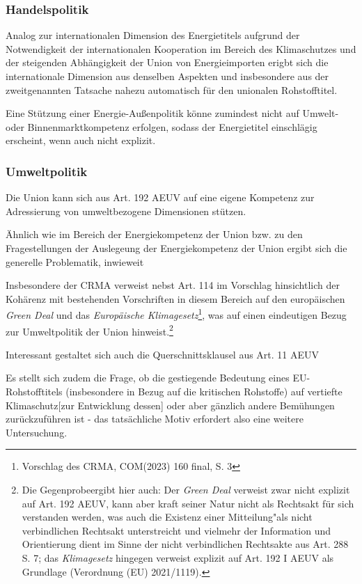 \documentclass[12pt,a4paper,oneside]{book} %
\begin{document}
	\subsubsection{Handelspolitik}
	
	
	Analog zur internationalen Dimension des Energietitels aufgrund der Notwendigkeit der internationalen Kooperation im Bereich des Klimaschutzes und der steigenden Abhängigkeit der Union von Energieimporten\autocite{Gundel, Theobald/Kühling, Europäisches Energierecht, V. Rn. 86} erigbt sich die internationale Dimension aus denselben Aspekten und insbesondere aus der zweitgenannten Tatsache nahezu automatisch für den unionalen Rohstofftitel.
	
	Eine Stützung einer Energie-Außenpolitik könne zumindest nicht auf Umwelt- oder Binnenmarktkompetenz erfolgen, sodass der Energietitel einschlägig erscheint, wenn auch nicht explizit.\autocite{Gundel, Theobald/Kühling, Europäisches Energierecht, V. Rn. 87}
	\subsubsection{Umweltpolitik}
	Die Union kann sich aus Art. 192 AEUV auf eine eigene Kompetenz zur Adressierung von umweltbezogene Dimensionen stützen.
	
	Ähnlich wie im Bereich der Energiekompetenz der Union bzw. zu den Fragestellungen der Auslegeung der Energiekompetenz der Union ergibt sich die generelle Problematik, inwieweit 
	
	Insbesondere der CRMA verweist nebst Art. 114 im Vorschlag hinsichtlich der Kohärenz mit bestehenden Vorschriften in diesem Bereich auf den europäischen \textit{Green Deal} und das \textit{Europäische Klimagesetz}\footnote{Vorschlag des CRMA, COM(2023) 160 final, S. 3}, was auf einen eindeutigen Bezug zur Umweltpolitik der Union hinweist.\footnote{Die \glqq Gegenprobe\grqq ergibt hier auch: Der \textit{Green Deal} verweist zwar nicht explizit auf Art. 192 AEUV, kann aber kraft seiner Natur nicht als Rechtsakt für sich verstanden werden, was auch die Existenz einer \glqq Mitteilung"\grqq als nicht verbindlichen Rechtsakt unterstreicht und vielmehr der Information und Orientierung dient im Sinne der nicht verbindlichen Rechtsakte aus Art. 288 S. 7; das \textit{Klimagesetz} hingegen verweist explizit auf Art. 192 I AEUV als Grundlage (Verordnung (EU) 2021/1119).}
	
	Interessant gestaltet sich auch die Querschnittsklausel aus Art. 11 AEUV
	
	Es stellt sich zudem die Frage, ob die gestiegende Bedeutung eines EU-Rohstofftitels (insbesondere in Bezug auf die kritischen Rohstoffe) auf vertiefte Klimaschutz[zur Entwicklung dessen]\autocite{Gundel in Tehobald/Kühling, IV, Energieumweltrecht, Rn. 74ff.} oder aber gänzlich andere Bemühungen zurückzuführen ist - das tatsächliche Motiv erfordert also eine weitere Untersuchung.
	
\end{document}
